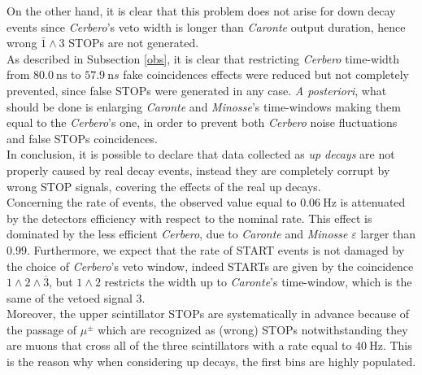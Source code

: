 On the other hand, it is clear that this problem does not arise for down decay events since \emph{Cerbero}'s veto width is longer than \emph{Caronte} output duration, hence wrong $\bar{1} \land 3$ STOPs are not generated.\\

As described in Subsection \ref{obs}, it is clear that restricting \emph{Cerbero} time-width from $\SI{80.0}{\nano\second}$ to $\SI{57.9}{\nano s}$ fake coincidences effects were reduced but not completely prevented, since false STOPs were generated in any case. 
\emph{A posteriori}, what should be done is enlarging \emph{Caronte} and \emph{Minosse}'s time-windows making them equal to the \emph{Cerbero}'s one, in order to prevent both \emph{Cerbero} noise fluctuations and false STOPs coincidences.\\

In conclusion, it is possible to declare that data collected as \emph{up decays} are not properly caused by real decay events, instead they are completely corrupt by wrong STOP signals, covering the effects of the real up decays.\\

Concerning the rate of events, the observed value equal to $\SI{0.06}{\hertz}$ is attenuated by the detectors efficiency with respect to the nominal rate. This effect is dominated by the less efficient \emph{Cerbero}, due to \emph{Caronte} and \emph{Minosse} $\varepsilon$ larger than $0.99$. Furthermore, we expect that the rate of START events is not damaged by the choice of \emph{Cerbero}'s veto window, indeed STARTs are given by the coincidence $1 \land 2 \land \overline 3$, but $1 \land 2 $ restricts the width up to \emph{Caronte}'s time-window, which is the same of the vetoed signal 3.\\

Moreover, the upper scintillator STOPs are systematically in advance because of the passage of $\mu^{\pm}$ which are recognized as (wrong) STOPs notwithstanding they are muons that cross all of the three scintillators with a rate equal to $\SI{40}{\hertz}$. This is the reason why when considering up decays, the first bins are highly populated.

